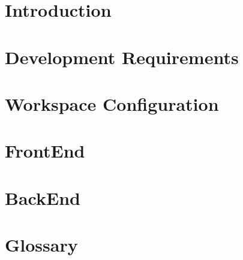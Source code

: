 \documentclass[a4paper, oneside, openany, dvipsnames, table]{article}
\begin{document}
\copertina{}
\newpage

\newpage
\tableofcontents
\newpage
\listoffigures
\newpage
\listoftables

\newpage
\newpage
\section{Introduction}
	

\newpage
\section{Development Requirements}


\newpage
\section{Workspace Configuration}


\newpage
\section{FrontEnd}



\newpage
\section{BackEnd}


\appendix
{}

\newpage
\section{Glossary}

\end{document}
